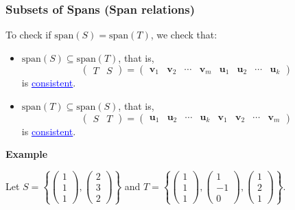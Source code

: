 \documentclass{article}
\newcommand{\bul}[1]{\textcolor{blue}{\underline{#1}}}
\newcommand{\sub}[1]{\vspace{10pt}\textbf{#1}}
\begin{document}
\subsubsection{Subsets of Spans (Span relations)}
\label{sec:sossr}
To check if \( \text{span}(S) = \text{span}(T) \), we check that:
\begin{itemize}
    \item \( \text{span}(S) \subseteq \text{span}(T) \), that is, 
    \[
    \left(
    \begin{array}{c|c}
        T & S
    \end{array}
    \right)
    =
    \left(
    \begin{array}{cccc|c|c|c|c}
    \mathbf{v}_1 & \mathbf{v}_2 & \cdots & \mathbf{v}_m & \mathbf{u}_1 & \mathbf{u}_2 & \cdots & \mathbf{u}_k
    \end{array}
    \right)
    \]
    is \bul{consistent}.
    \item \( \text{span}(T) \subseteq \text{span}(S) \), that is,
    \[
    \left(
    \begin{array}{c|c}
        S & T
    \end{array}
    \right)
    =
    \left(
    \begin{array}{cccc|c|c|c|c}
    \mathbf{u}_1 & \mathbf{u}_2 & \cdots & \mathbf{u}_k & \mathbf{v}_1 & \mathbf{v}_2 & \cdots & \mathbf{v}_m
    \end{array}
    \right)
    \]
    is \bul{consistent}.
\end{itemize}

\sub{Example}

Let \( S = \left\{ \begin{pmatrix} 1 \\ 1 \\ 1 \end{pmatrix}, \begin{pmatrix} 2 \\ 3 \\ 2 \end{pmatrix} \right\} \)
and \( T = \left\{ \begin{pmatrix} 1 \\ 1 \\ 1 \end{pmatrix}, \begin{pmatrix} 1 \\ -1 \\ 0 \end{pmatrix}, \begin{pmatrix} 1 \\ 2 \\ 1 \end{pmatrix} \right\} \).
\end{document}
